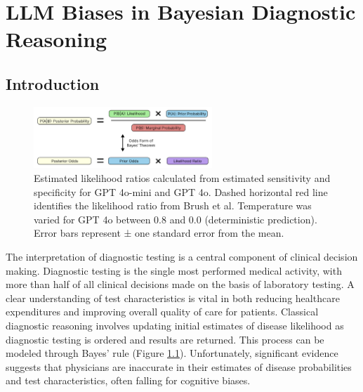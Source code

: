 \chapter{LLM Biases in Bayesian Diagnostic Reasoning} \label{chapter:race-bayes}

\section{Introduction}

\begin{figure}
	\centering
	\includegraphics[width=0.6\textwidth] {figures/aim2/Figure1.png}
	\caption{Estimated likelihood ratios calculated from estimated sensitivity and specificity for GPT 4o-mini and GPT 4o. Dashed horizontal red line identifies the likelihood ratio from Brush et al. Temperature was varied for GPT 4o between 0.8 and 0.0 (deterministic prediction). Error bars represent ± one standard error from the mean.} \label{fig:aim2-bayesrule}
\end{figure}

The interpretation of diagnostic testing is a central component of clinical decision making. Diagnostic testing is the single most performed medical activity, with more than half of all clinical decisions made on the basis of laboratory testing\citep{brucealexanderMessagePresidentReducing2012, zhiLandscapeInappropriateLaboratory2013}. A clear understanding of test characteristics is vital in both reducing healthcare expenditures and improving overall quality of care for patients\citep{dugganWhyPretestProbability2020, reedPretestProbabilityShould2013}. Classical diagnostic reasoning involves updating initial estimates of disease likelihood as diagnostic testing is ordered and results are returned. This process can be modeled through Bayes’ rule (Figure \ref{fig:aim2-bayesrule})\citep{boursBayesRuleDiagnosis2021}. Unfortunately, significant evidence suggests that physicians are inaccurate in their estimates of disease probabilities and test characteristics, often falling for cognitive biases\citep{cahanProbabilisticReasoningClinical2003, hallEstimationPosttestProbabilities2014, manraiMedicinesUncomfortableRelationship2014, morganAccuracyPractitionerEstimates2021, normanCausesErrorsClinical2017}.

